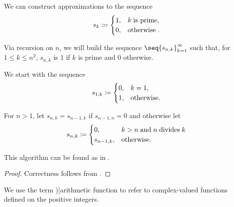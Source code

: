 \begin{algorithm}\label{alg:sieve_of_eratosthenes}
  We can construct approximations to the sequence
  \begin{equation*}
    s_k \coloneqq \begin{cases}
      1, &k \T{is prime}, \\
      0, &\T{otherwise}.
    \end{cases}
  \end{equation*}

  Via recursion on \( n \), we will build the sequence \( \seq{ s_{n,k} }_{k=1}^\infty \) such that, for \( 1 \leq k \leq n^2 \), \( s_{n,k} \) is \( 1 \) if \( k \) is prime and \( 0 \) otherwise.

  \begin{thmenum}
     We start with the sequence
    \begin{equation*}
      s_{1,k} \coloneqq \begin{cases}
        0, &k = 1, \\
        1, &\T{otherwise.}
      \end{cases}
    \end{equation*}

     For \( n > 1 \), let \( s_{n,k} = s_{n-1,k} \) if \( s_{n-1,n} = 0 \) and otherwise let
    \begin{equation*}
      s_{n,k} \coloneqq \begin{cases}
        0,         &k > n \T{and} n \T{divides} k \\
        s_{n-1,k}, &\T{otherwise.}
      \end{cases}
    \end{equation*}
  \end{thmenum}
\end{algorithm}
\begin{comments}
  \item This algorithm can be found as  in \cite{notebook:code}.
\end{comments}
\begin{proof}
  Correctness follows from .
\end{proof}

\begin{definition}\label{def:arithmetic_function}
  We use the term \term[en=arithmetical function (\cite[24]{Apostol1976AnalyticNumberTheory})]{arithmetic function} to refer to complex-valued functions defined on the positive integers.
\end{definition}

